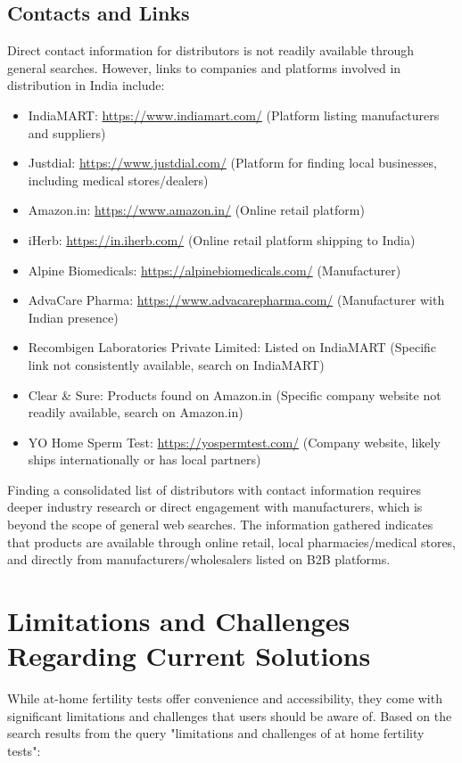 \documentclass{article}
\begin{document}
\subsection{Contacts and Links}
Direct contact information for distributors is not readily available through general searches. However, links to companies and platforms involved in distribution in India include:
\begin{itemize}
    \item IndiaMART: \url{https://www.indiamart.com/} (Platform listing manufacturers and suppliers)
    \item Justdial: \url{https://www.justdial.com/} (Platform for finding local businesses, including medical stores/dealers)
    \item Amazon.in: \url{https://www.amazon.in/} (Online retail platform)
    \item iHerb: \url{https://in.iherb.com/} (Online retail platform shipping to India)
    \item Alpine Biomedicals: \url{https://alpinebiomedicals.com/} (Manufacturer)
    \item AdvaCare Pharma: \url{https://www.advacarepharma.com/} (Manufacturer with Indian presence)
    \item Recombigen Laboratories Private Limited: Listed on IndiaMART (Specific link not consistently available, search on IndiaMART)
    \item Clear \& Sure: Products found on Amazon.in (Specific company website not readily available, search on Amazon.in)
    \item YO Home Sperm Test: \url{https://yospermtest.com/} (Company website, likely ships internationally or has local partners)
\end{itemize}

Finding a consolidated list of distributors with contact information requires deeper industry research or direct engagement with manufacturers, which is beyond the scope of general web searches. The information gathered indicates that products are available through online retail, local pharmacies/medical stores, and directly from manufacturers/wholesalers listed on B2B platforms.

\section{Limitations and Challenges Regarding Current Solutions}

While at-home fertility tests offer convenience and accessibility, they come with significant limitations and challenges that users should be aware of. Based on the search results from the query "limitations and challenges of at home fertility tests":
\end{document}
